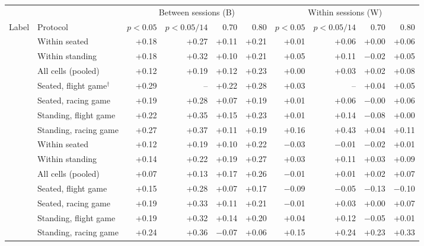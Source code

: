 \begin{tabular}{llrrrrrrrr}
\toprule
 & & \multicolumn{4}{c}{Between sessions (B)} & \multicolumn{4}{c}{Within sessions (W)} \\
\cmidrule(lr){3-6}\cmidrule(lr){7-10}
Label & Protocol & $p<0.05$ & $p<0.05/14$ & 0.70 & 0.80 & $p<0.05$ & $p<0.05/14$ & 0.70 & 0.80 \\
\midrule
\sevtwo{} & Within seated & +0.18 & +0.27 & +0.11 & +0.21 & +0.01 & +0.06 & +0.00 & +0.06 \\
 & Within standing & +0.18 & +0.32 & +0.10 & +0.21 & +0.05 & +0.11 & $-$0.02 & +0.05 \\
 & All cells (pooled) & +0.12 & +0.19 & +0.12 & +0.23 & +0.00 & +0.03 & +0.02 & +0.08 \\
 & Seated, flight game$^\dagger$ & +0.29 & – & +0.22 & +0.28 & +0.03 & – & +0.04 & +0.05 \\
 & Seated, racing game & +0.19 & +0.28 & +0.07 & +0.19 & +0.01 & +0.06 & $-$0.00 & +0.06 \\
 & Standing, flight game & +0.22 & +0.35 & +0.15 & +0.23 & +0.01 & +0.14 & $-$0.08 & +0.00 \\
 & Standing, racing game & +0.27 & +0.37 & +0.11 & +0.19 & +0.16 & +0.43 & +0.04 & +0.11 \\
\midrule
\sevone{} & Within seated & +0.12 & +0.19 & +0.10 & +0.22 & $-$0.03 & $-$0.01 & $-$0.02 & +0.01 \\
 & Within standing & +0.14 & +0.22 & +0.19 & +0.27 & +0.03 & +0.11 & +0.03 & +0.09 \\
 & All cells (pooled) & +0.07 & +0.13 & +0.17 & +0.26 & $-$0.01 & +0.01 & +0.02 & +0.07 \\
 & Seated, flight game & +0.15 & +0.28 & +0.07 & +0.17 & $-$0.09 & $-$0.05 & $-$0.13 & $-$0.10 \\
 & Seated, racing game & +0.19 & +0.33 & +0.11 & +0.21 & $-$0.01 & +0.03 & +0.00 & +0.07 \\
 & Standing, flight game & +0.19 & +0.32 & +0.14 & +0.20 & +0.04 & +0.12 & $-$0.05 & +0.01 \\
 & Standing, racing game & +0.24 & +0.36 & $-$0.07 & +0.06 & +0.15 & +0.24 & +0.23 & +0.33 \\
\bottomrule
\end{tabular}
